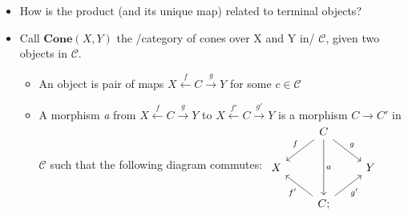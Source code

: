 \begin{itemize}
    \item How is the product (and its unique map) related to terminal objects?
    \item Call $\mathbf{Cone}(X,Y)$ the /category of cones over X and Y in/ $\mathcal{C}$, given two objects in $\mathcal{C}$.
          \begin{itemize}
            \item An object is pair of maps $X \xleftarrow{f}C\xrightarrow{g}Y$ for some $c \in \mathcal{C}$
            \item A morphism \emph{a} from  $X \xleftarrow{f}C\xrightarrow{g}Y$ to  $X \xleftarrow{f'}C\xrightarrow{g'}Y$ is a morphism $C \rightarrow C'$ in $\mathcal{C}$ such that the following diagram commutes: $\begin{tikzcd}  & C \arrow[dd, "a"] \arrow[ld, "f"'] \arrow[rd, "g"] &   \\X &                                                    & Y \\  & C; \arrow[lu, "f'"] \arrow[ru, "g'"']              &  \end{tikzcd}$

          \end{itemize}
  \end{itemize}
